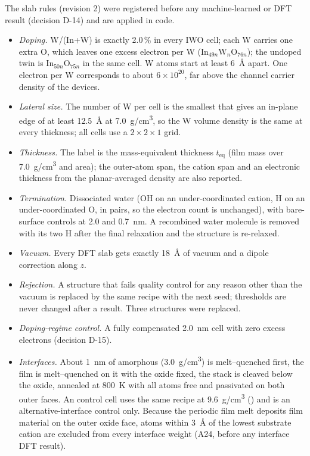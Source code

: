 The slab rules (revision 2) were registered before any machine-learned or DFT result (decision D-14) and are applied
in code. %
\begin{itemize}
\item \emph{Doping.} W/(In+W) is exactly 2.0\,\% in every IWO cell; each W carries one extra O, which leaves one excess
electron per W (In$_{49n}$W$_n$O$_{76n}$); the undoped twin is In$_{50n}$O$_{75n}$ in the same cell. W atoms start at
least \SI{6}{\angstrom} apart. %
One electron per W corresponds to about $6\times10^{20}$\cmcu{}, far above the channel carrier density of the devices. %
\item \emph{Lateral size.} The number of W per cell is the smallest that gives an in-plane edge of at least
\SI{12.5}{\angstrom} at \SI{7.0}{g/cm^3}, so the W volume density is the same at every thickness; all cells use a
$2\times2\times1$ grid. %
\item \emph{Thickness.} The label is the mass-equivalent thickness $t_{\mathrm{eq}}$ (film mass over
\SI{7.0}{g/cm^3} and area); the outer-atom span, the cation span and an electronic thickness from the planar-averaged
density are also reported. %
\item \emph{Termination.} Dissociated water (OH on an under-coordinated cation, H on an under-coordinated O, in pairs,
so the electron count is unchanged), with bare-surface controls at 2.0 and \SI{0.7}{nm}. %
A recombined water molecule is removed with its two H after the final relaxation and the structure is
re-relaxed. %
\item \emph{Vacuum.} Every DFT slab gets exactly \SI{18}{\angstrom} of vacuum and a dipole correction along $z$. %
\item \emph{Rejection.} A structure that fails quality control for any reason other than the vacuum is replaced by the
same recipe with the next seed; thresholds are never changed after a result. Three structures were replaced. %
\item \emph{Doping-regime control.} A fully compensated \SI{2.0}{nm} cell with zero excess electrons (decision D-15). %
\item \emph{Interfaces.} About \SI{1}{nm} of amorphous \AlO{} (\SI{3.0}{g/cm^3}) is melt--quenched first, the film is
melt--quenched on it with the oxide fixed, the stack is cleaved below the oxide, annealed at \SI{800}{K} with all atoms
free and passivated on both outer faces. %
An \HfO{} control cell uses the same recipe at \SI{9.6}{g/cm^3} () and is an alternative-interface
control only. %
Because the periodic film melt deposits film material on the outer oxide face, atoms within \SI{3}{\angstrom} of the
lowest substrate cation are excluded from every interface weight (A24, before any interface DFT result). %
\end{itemize}

